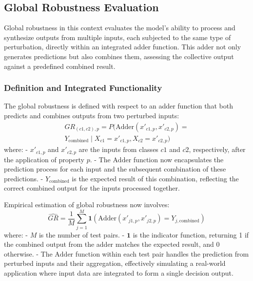 \documentclass[10pt, conference, a4paper, final]{IEEEtran}
\begin{document}
        \subsection{Global Robustness Evaluation}
        Global robustness in this context evaluates the model's ability to process and synthesize outputs from multiple inputs, each subjected to the same type of perturbation, directly within an integrated adder function. This adder not only generates predictions but also combines them, assessing the collective output against a predefined combined result.
        
        \subsubsection{Definition and Integrated Functionality}
        The global robustness is defined with respect to an adder function that both predicts and combines outputs from two perturbed inputs:
        \begin{multline}
            GR_{(c1, c2), p} = P(\text{Adder}(x'_{c1,p}, x'_{c2,p}) = \\
            Y_{\text{combined}} \mid X_{c1} = x'_{c1,p}, X_{c2} = x'_{c2,p})
        \end{multline}
        where:        
        - \(x'_{c1,p}\) and \(x'_{c2,p}\) are the inputs from classes \(c1\) and \(c2\), respectively, after the application of property \(p\).
        - The \(\text{Adder}\) function now encapsulates the prediction process for each input and the subsequent combination of these predictions.
        - \(Y_{\text{combined}}\) is the expected result of this combination, reflecting the correct combined output for the inputs processed together.
        
        Empirical estimation of global robustness now involves:
        \begin{equation}
            \hat{GR} = \frac{1}{M} \sum_{j=1}^M \mathbf{1}(\text{Adder}(x'_{j1,p}, x'_{j2,p}) = Y_{j,\text{combined}})
        \end{equation}
        where:
        - \(M\) is the number of test pairs.
        - \(\mathbf{1}\) is the indicator function, returning 1 if the combined output from the adder matches the expected result, and 0 otherwise.
        - The \(\text{Adder}\) function within each test pair handles the prediction from perturbed inputs and their aggregation, effectively simulating a real-world application where input data are integrated to form a single decision output.
   
\end{document}

